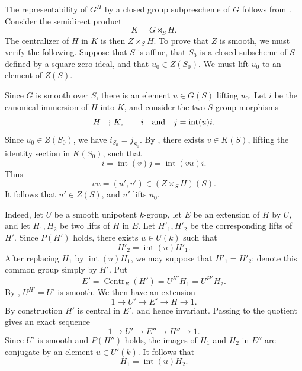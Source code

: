 The representability of \(G^H\) by a closed group subprescheme of
\(G\) follows from .  Consider the semidirect
product
\[
  K=G\rtimes_S H.
\]
The centralizer of \(H\) in \(K\) is then \(Z\times_S H\).  To prove
that \(Z\) is smooth, we must verify the following.  Suppose that
\(S\) is affine, that \(S_0\) is a closed subscheme of \(S\) defined
by a square-zero ideal, and that \(u_0\in Z(S_0)\).  We must lift
\(u_0\) to an element of \(Z(S)\).

Since \(G\) is smooth over \(S\), there is an element \(u\in G(S)\)
lifting \(u_0\).  Let \(i\) be the canonical immersion of \(H\) into
\(K\), and consider the two \(S\)-group morphisms
\[
  H\rightrightarrows K,\qquad i
  \quad\hbox{and}\quad
  j=\operatorname{int}(u)i.
\]
Since \(u_0\in Z(S_0)\), we have \(i_{S_0}=j_{S_0}\).  By
, there exists \(v\in K(S)\), lifting the identity
section in \(K(S_0)\), such that
\[
  i=\operatorname{int}(v)j
   =\operatorname{int}(vu)i.
\]
Thus
\[
  vu=(u',v')\in (Z\times_S H)(S).
\]
It follows that \(u'\in Z(S)\), and \(u'\) lifts \(u_0\).


Indeed, let \(U\) be a smooth unipotent \(k\)-group, let \(E\) be an
extension of \(H\) by \(U\), and let \(H_1,H_2\) be two lifts of
\(H\) in \(E\).  Let \(H'_1,H'_2\) be the corresponding lifts of
\(H'\).  Since \(P(H')\) holds, there exists \(u\in U(k)\) such that
\[
  H'_2=\operatorname{int}(u)H'_1.
\]
After replacing \(H_1\) by \(\operatorname{int}(u)H_1\), we may
suppose that \(H'_1=H'_2\); denote this common group simply by
\(H'\).  Put
\[
  E'=\operatorname{Centr}_E(H')
     =U^{H'}H_1
     =U^{H'}H_2.
\]
By , \(U^{H'}=U'\) is smooth.  We then have an extension
\[
  1\longrightarrow U'\longrightarrow E'
    \longrightarrow H\longrightarrow1.
\]
By construction \(H'\) is central in \(E'\), and hence invariant.
Passing to the quotient gives an exact sequence
\[
  1\longrightarrow U'\longrightarrow E''
    \longrightarrow H''\longrightarrow1.
\]
Since \(U'\) is smooth and \(P(H'')\) holds, the images of \(H_1\)
and \(H_2\) in \(E''\) are conjugate by an element
\(u\in U'(k)\).  It follows that
\[
  H_1=\operatorname{int}(u)H_2.
\]

